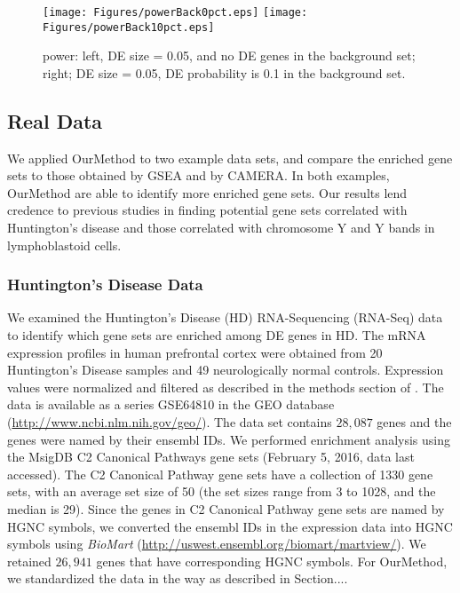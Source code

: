 \documentclass[11pt, a4paper]{article}
\begin{document}
			\begin{figure}[H]
				\caption{power: left, DE size = 0.05, and no DE genes in the background set; right; DE size = 0.05, DE probability is 0.1 in the background set.}\label{fig:power}
				\begin{center}
					\texttt{[image: Figures/powerBack0pct.eps]}
					\texttt{[image: Figures/powerBack10pct.eps]}
				\end{center} 
			\end{figure} 
		
		\subsection{Real Data}
		We applied OurMethod to two example data sets, and compare the enriched gene sets to those obtained by GSEA and by CAMERA. In both examples, OurMethod are able to identify more enriched gene sets. Our results lend credence to previous studies in finding potential gene sets correlated with Huntington's disease and those correlated with chromosome Y and Y bands in lymphoblastoid cells.  
		
		\subsubsection*{Huntington's Disease Data}
		 We examined the Huntington's Disease (HD) RNA-Sequencing (RNA-Seq) data 	\citep{labadorf2015rna}  to identify which gene sets are enriched among DE genes in HD. The mRNA expression profiles in human prefrontal cortex were obtained from 20 Huntington's Disease samples and 49 neurologically normal controls.  Expression values were normalized and filtered as described in the methods section of \citep{labadorf2015rna}.
		 The data is available as a series GSE64810 in the GEO database (\url{http://www.ncbi.nlm.nih.gov/geo/}). The data set contains $28,087$ genes and the genes were named by their ensembl IDs. We performed enrichment analysis using the MsigDB \citep{subramanian2005gene} C2 Canonical Pathways gene sets (February 5, 2016, data last accessed). The C2 Canonical Pathway gene sets have a collection of 1330 gene sets, with an average set size of 50 (the set sizes range from 3 to 1028, and the median is 29). Since the genes in C2 Canonical Pathway gene sets are named by HGNC symbols, we converted the ensembl IDs in the expression data into HGNC symbols using \textit{BioMart} (\url{http://uswest.ensembl.org/biomart/martview/}). We retained $26,941$ genes that have corresponding HGNC symbols. For OurMethod, we standardized the data in the way as described in Section....
		 
\end{document}
